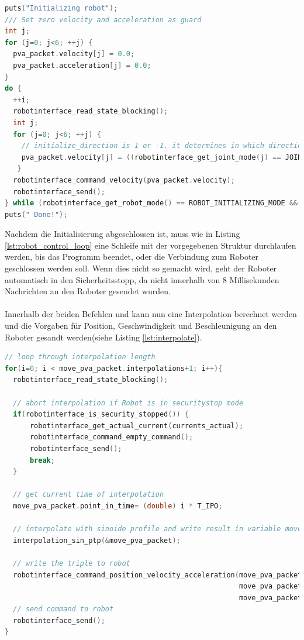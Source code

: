 \begin{lstlisting}[language=C,caption={Initialisierung der einzelnen Gelenke}, label=lst:initialize_robot_lst,captionpos=b]
puts("Initializing robot");
/// Set zero velocity and acceleration as guard
int j;
for (j=0; j<6; ++j) {
  pva_packet.velocity[j] = 0.0;
  pva_packet.acceleration[j] = 0.0;
}
do {
  ++i;
  robotinterface_read_state_blocking();
  int j;
  for (j=0; j<6; ++j) {
    // initialize_direction is 1 or -1. it determines in which direction die Joint is moving during the initialization
    pva_packet.velocity[j] = ((robotinterface_get_joint_mode(j) == JOINT_INITIALISATION_MODE)) ? (initialize_direction)* 0.1 : 0.0;
   }
  robotinterface_command_velocity(pva_packet.velocity);
  robotinterface_send();
} while (robotinterface_get_robot_mode() == ROBOT_INITIALIZING_MODE && exit_flag == false);
puts(" Done!");
\end{lstlisting}

Nachdem die Initialisierung abgeschlossen ist, muss wie in Listing \ref{lst:robot_control_loop} eine Schleife mit der vorgegebenen Struktur durchlaufen werden, bis das Programm beendet, oder die Verbindung zum Roboter geschlossen werden soll. Wenn dies nicht so gemacht wird, geht der Roboter automatisch in den Sicherheitsstopp, da nicht innerhalb von 8 Millisekunden Nachrichten an den Roboter gesendet wurden.
\\\\
Innerhalb der beiden Befehlen  und  kann nun eine Interpolation berechnet werden und die Vorgaben für Position, Geschwindigkeit und Beschleunigung an den Roboter gesandt werden(siehe Listing \ref{lst:interpolate}).

\begin{lstlisting}[language=C,caption={Interpolation eines berechneten Wegs}, label=lst:interpolate,captionpos=b]
// loop through interpolation length  
for(i=0; i < move_pva_packet.interpolations+1; i++){
  robotinterface_read_state_blocking();

  // abort interpolation if Robot is in securitystop mode
  if(robotinterface_is_security_stopped()) {
      robotinterface_get_actual_current(currents_actual);
      robotinterface_command_empty_command();
      robotinterface_send();
      break;
  }

  // get current time of interpolation 
  move_pva_packet.point_in_time= (double) i * T_IPO;

  // interpolate with sinoide profile and write result in variable move_pva_packet
  interpolation_sin_ptp(&move_pva_packet);

  // write the triple to robot
  robotinterface_command_position_velocity_acceleration(move_pva_packet.pva.position,
                                                        move_pva_packet.pva.velocity,
                                                        move_pva_packet.pva.acceleration);
  // send command to robot
  robotinterface_send();
}
\end{lstlisting}

